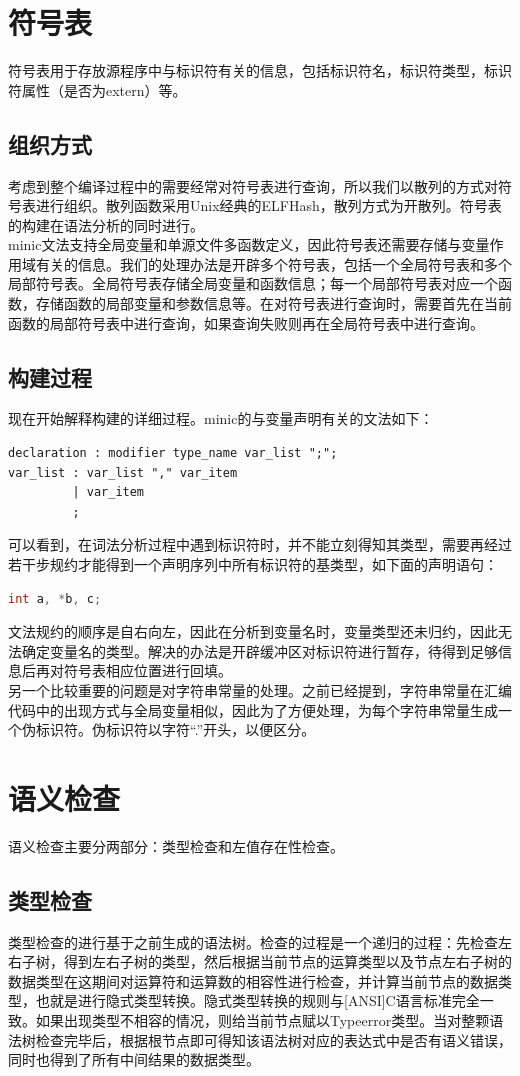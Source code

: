\documentclass[12pt,a4paper,Flow]{report}
\begin{document}
\section{符号表}
符号表用于存放源程序中与标识符有关的信息，包括标识符名，标识符类型，标识符属性（是否为extern）等。
\subsection{组织方式}
考虑到整个编译过程中的需要经常对符号表进行查询，所以我们以散列的方式对符号表进行组织。散列函数采用Unix经典的ELFHash，散列方式为开散列。符号表的构建在语法分析的同时进行。\\
\indent minic文法支持全局变量和单源文件多函数定义，因此符号表还需要存储与变量作用域有关的信息。我们的处理办法是开辟多个符号表，包括一个全局符号表和多个局部符号表。全局符号表存储全局变量和函数信息；每一个局部符号表对应一个函数，存储函数的局部变量和参数信息等。在对符号表进行查询时，需要首先在当前函数的局部符号表中进行查询，如果查询失败则再在全局符号表中进行查询。
\subsection{构建过程}
现在开始解释构建的详细过程。minic的与变量声明有关的文法如下：
\begin{verbatim}
declaration : modifier type_name var_list ";";
var_list : var_list "," var_item
         | var_item
         ;
\end{verbatim}
可以看到，在词法分析过程中遇到标识符时，并不能立刻得知其类型，需要再经过若干步规约才能得到一个声明序列中所有标识符的基类型，如下面的声明语句：
\begin{lstlisting}[language=c]
  int a, *b, c;
\end{lstlisting}
文法规约的顺序是自右向左，因此在分析到变量名时，变量类型还未归约，因此无法确定变量名的类型。解决的办法是开辟缓冲区对标识符进行暂存，待得到足够信息后再对符号表相应位置进行回填。\\
\indent 另一个比较重要的问题是对字符串常量的处理。之前已经提到，字符串常量在汇编代码中的出现方式与全局变量相似，因此为了方便处理，为每个字符串常量生成一个伪标识符。伪标识符以字符“.”开头，以便区分。
\section{语义检查}
语义检查主要分两部分：类型检查和左值存在性检查。
\subsection{类型检查}
\indent 类型检查的进行基于之前生成的语法树。检查的过程是一个递归的过程：先检查左右子树，得到左右子树的类型，然后根据当前节点的运算类型以及节点左右子树的数据类型在这期间对运算符和运算数的相容性进行检查，并计算当前节点的数据类型，也就是进行隐式类型转换。隐式类型转换的规则与[ANSI]C语言标准完全一致。如果出现类型不相容的情况，则给当前节点赋以Typeerror类型。当对整颗语法树检查完毕后，根据根节点即可得知该语法树对应的表达式中是否有语义错误，同时也得到了所有中间结果的数据类型。
\end{document}
